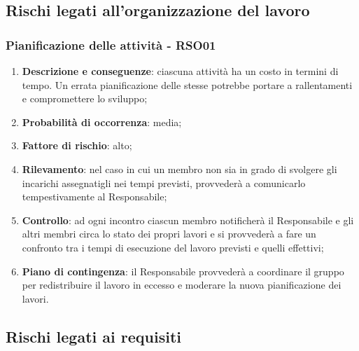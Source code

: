 \subsection{Rischi legati all'organizzazione del lavoro}
	\subsubsection{Pianificazione delle attività - RSO01}
	\begin{enumerate}
		\item \textbf{Descrizione e conseguenze}: ciascuna attività ha un costo in termini di tempo. Un errata pianificazione delle stesse potrebbe portare a rallentamenti e compromettere lo sviluppo; 
		\item \textbf{Probabilità di occorrenza}: media;
		\item \textbf{Fattore di rischio}: alto;
		\item \textbf{Rilevamento}: nel caso in cui un membro non sia in grado di svolgere gli incarichi assegnatigli nei tempi previsti, provvederà a comunicarlo tempestivamente al Responsabile;		
		\item \textbf{Controllo}: ad ogni incontro ciascun membro notificherà il Responsabile e gli altri membri circa lo stato dei propri lavori e si provvederà a fare un confronto tra i tempi di esecuzione del lavoro previsti e quelli effettivi; 
		\item \textbf{Piano di contingenza}: il Responsabile provvederà a coordinare il gruppo per redistribuire il lavoro in eccesso e moderare la nuova pianificazione dei lavori.
	\end{enumerate}
	
\subsection{Rischi legati ai requisiti}
